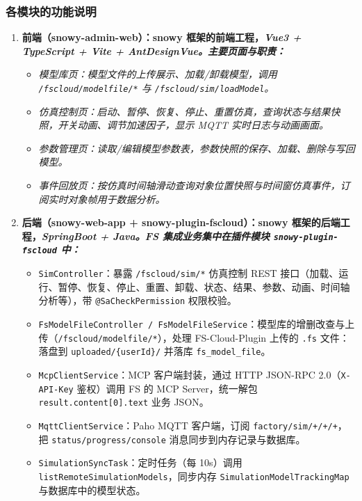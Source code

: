 \subsubsection{各模块的功能说明}
\begin{enumerate}[label=\arabic*)]
	\item \bf{前端（snowy-admin-web）}：snowy 框架的前端工程，\it{Vue3 + TypeScript + Vite + AntDesignVue}。主要页面与职责：
	\begin{itemize}
		\item \it{模型库页}：模型文件的上传展示、加载/卸载模型，调用 \texttt{/fscloud/modelfile/*} 与 \texttt{/fscloud/sim/loadModel}。
		\item \it{仿真控制页}：启动、暂停、恢复、停止、重置仿真，查询状态与结果快照，开关动画、调节加速因子，显示 MQTT 实时日志与动画画面。
		\item \it{参数管理页}：读取/编辑模型参数表，参数快照的保存、加载、删除与写回模型。
		\item \it{事件回放页}：按仿真时间轴滑动查询对象位置快照与时间窗仿真事件，订阅实时对象帧用于数据分析。
	\end{itemize}
	\item \bf{后端（snowy-web-app + snowy-plugin-fscloud）}：snowy 框架的后端工程，\it{SpringBoot + Java}。FS 集成业务集中在插件模块 \texttt{snowy-plugin-fscloud} 中：
	\begin{itemize}
		\item \texttt{SimController}：暴露 \texttt{/fscloud/sim/*} 仿真控制 REST 接口（加载、运行、暂停、恢复、停止、重置、卸载、状态、结果、参数、动画、时间轴分析等），带 \texttt{@SaCheckPermission} 权限校验。
		\item \texttt{FsModelFileController / FsModelFileService}：模型库的增删改查与上传（\texttt{/fscloud/modelfile/*}），处理 FS-Cloud-Plugin 上传的 \texttt{.fs} 文件：落盘到 \texttt{uploaded/\{userId\}/} 并落库 \texttt{fs\_model\_file}。
		\item \texttt{McpClientService}：MCP 客户端封装，通过 HTTP JSON-RPC 2.0（\texttt{X-API-Key} 鉴权）调用 FS 的 MCP Server，统一解包 \texttt{result.content[0].text} 业务 JSON。
		\item \texttt{MqttClientService}：Paho MQTT 客户端，订阅 \texttt{factory/sim/+/+/+}，把 \texttt{status/progress/console} 消息同步到内存记录与数据库。
		\item \texttt{SimulationSyncTask}：定时任务（每 10s）调用 \texttt{listRemoteSimulationModels}，同步内存 \texttt{SimulationModelTrackingMap} 与数据库中的模型状态。
	\end{itemize}

\end{enumerate}
